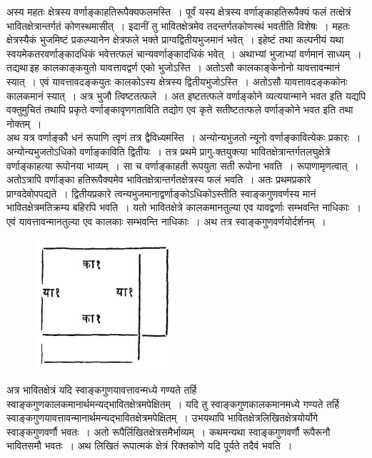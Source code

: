 \documentclass[11pt, openany]{book}
\begin{document}
 अस्य महतः क्षेत्रस्य वर्णाङ्काहतिरूपैक्यफलमस्ति~। पूर्वं यस्य
क्षेत्रस्य वर्णाङ्काहतिरूपैक्यं फलं तत्क्षेत्रं भावितक्षेत्रान्तर्गतं कोणस्थमासीत्~। इदानीं
तु भावितक्षेत्रमेव
तदन्तर्गतकोणस्थं भवतीति विशेषः~। महतः क्षेत्रस्यैकं भुजमिष्टं
प्रकल्प्यानेन क्षेत्रफले
भक्ते प्राग्वद्वितीयभुजमानं भवेत्~। इहेष्टं तथा कल्पनीयं यथा
स्वयमेकतरवर्णाङ्कादधिकं
भवेत्तत्फलं चान्यवर्णाङ्कादधिकं भवेत्~। अथाभ्यां भुजाभ्यां वर्णमानं
साध्यम्~।
तद्यथा\textendash \,इह कालकाङ्कयुतो यावत्तावद्वर्ण एको भुजोऽस्ति~। अतोऽसौ
कालकाङ्केनोनो
यावत्तावन्मानं स्यात्~। एवं यावत्तावदङ्कयुतः कालकोऽस्य क्षेत्रस्य
द्वितीयभुजोऽस्ति~।
अतोऽसौ यावत्तावदङ्ककोनः कालकमानं स्यात्~। अत्र भुजौ त्विष्टतत्फले~। अत
इष्टतत्फले
वर्णाङ्कोने व्यत्ययान्माने भवत इति यद्यपि वक्तुमुचितं तथापि प्रकृते
वर्णाङ्कावृणगताविति तद्योग एव कृते सतीष्टतत्फले वर्णाङ्कोने भवत इति तथा नोक्तम्~।\\

\vspace{-4mm}
 अथ यत्र वर्णाङ्कौ धनं रूपाणि त्वृणं तत्र द्वैविध्यमस्ति~। अन्योन्यभुजतो
न्यूनो
वर्णाङ्कावित्येकः प्रकारः~। अन्योन्यभुजतोऽधिको वर्णाङ्काविति द्वितीयः~।
तत्र प्रथमे
प्रागु-क्तयुक्त्या भावितक्षेत्रान्तर्गतलघुक्षेत्रे वर्णाङ्काहत्या रूपोनया
भाव्यम्~। सा च
वर्णाङ्काहती रूपयुता सती रूपोना भवति~। रूपाणामृणत्वात्~। अतोऽत्रापि
वर्णाङ्का
हतिरूपैक्यमेव भावितक्षेत्रान्तर्गतक्षेत्रस्य फलं भवति~। अतः
प्रथमप्रकारे प्राग्वदेवोपपद्यते~। द्वितीयप्रकारे त्वन्यभुजमानाद्वर्णाङ्कोऽधिकोऽस्तीति
स्वाङ्कगुणवर्णस्य मानं भावितक्षेत्रमतिक्रम्य बहिरपि भवति~। यतो भावितक्षेत्रे कालकमानतुल्या एव
यावद्वर्णाः
\newpage
\noindent सम्भवन्ति नाधिकाः~। एवं यावत्तावन्मानतुल्या एव कालकाः सम्भवन्ति नाधिकाः~। अथ तत्र स्वाङ्कगुणवर्णयोर्दर्शनम्~।
\vspace{-2mm}

\begin{figure}[h!]
    \centering
    \includegraphics[scale=0.7]{graphics/Capture25.png}
\end{figure}
\vspace{-2mm}

 अत्र भावितक्षेत्रं यदि स्वाङ्कगुणयावत्तावन्मध्ये गण्यते तर्हि
स्वाङ्कगुणकालकमानार्थमन्यद्भावितक्षेत्रमपेक्षितम्~। यदि तु स्वाङ्कगुणकालकमानमध्ये
गण्यते तर्हि
स्वाङ्कगुणयावत्तावन्मानार्थमन्यद्भावितक्षेत्रमपेक्षितम्~। उभयथापि
भावितक्षेत्रलिखितक्षेत्रयोर्योगे स्वाङ्कगुणवर्णौ भवतः~। अतो
रूपैर्लिखितक्षेत्रसमैर्भाव्यम्~। कथमन्यथा
स्वाङ्कगुणवर्णौ रूपैरूनौ भावितसमौ भवतः~। अथ लिखितं रूपात्मकं क्षेत्रं
रिक्तकोणे यदि पूर्यते तदैवं भवति~।
\vspace{-2mm}
\end{document}
